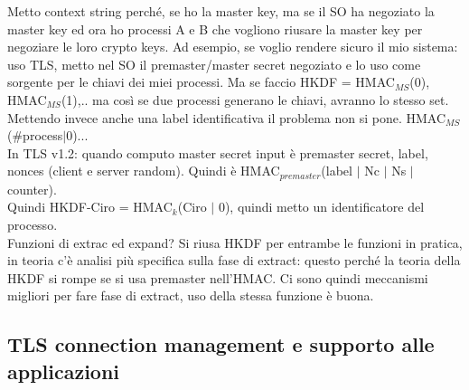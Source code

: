 \documentclass[16px]{article}
\begin{document}
Metto context string perché, se ho la master key, ma se il SO ha negoziato la master key ed ora ho processi A e B che vogliono riusare la master key per negoziare le loro crypto keys. Ad esempio, se voglio rendere sicuro il mio sistema: uso TLS, metto nel SO il premaster/master secret negoziato e lo uso come sorgente per le chiavi dei miei processi. Ma se faccio HKDF = HMAC$_{MS}$(0), HMAC$_{MS}$(1),.. ma così se due processi generano le chiavi, avranno lo stesso set. Mettendo invece anche una label identificativa il problema non si pone. HMAC$_{MS}$(\#process$|$0)...\\ In TLS v1.2: quando computo master secret input è premaster secret, label, nonces (client e server random). Quindi è HMAC$_{premaster}$(label $|$ Nc $|$ Ns $|$ counter).\\ Quindi HKDF-Ciro = HMAC$_k$(Ciro $|$ 0), quindi metto un identificatore del processo.\\ Funzioni di extrac ed expand? Si riusa HKDF per entrambe le funzioni in pratica, in teoria c'è analisi più specifica sulla fase di extract: questo perché la teoria della HKDF si rompe se si usa premaster nell'HMAC. Ci sono quindi meccanismi migliori per fare  fase di extract, uso della stessa funzione è buona.
\subsection{TLS connection management e supporto alle applicazioni}
\end{document}

